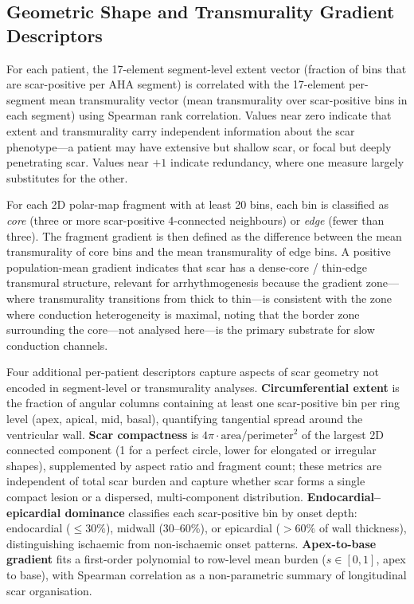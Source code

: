 \subsection{Geometric Shape and Transmurality Gradient Descriptors}

For each patient, the 17-element segment-level extent vector (fraction of bins that are
scar-positive per AHA segment) is correlated with the 17-element per-segment mean
transmurality vector (mean transmurality over scar-positive bins in each segment) using
Spearman rank correlation. Values near zero indicate that extent and transmurality carry
independent information about the scar phenotype---a patient may have extensive but
shallow scar, or focal but deeply penetrating scar.
Values near $+1$ indicate redundancy, where one measure largely substitutes for the other.

For each 2D polar-map fragment with at least 20 bins, each bin is classified as \emph{core}
(three or more scar-positive 4-connected neighbours) or \emph{edge} (fewer than three).
The fragment gradient is then defined as the difference between the mean transmurality of
core bins and the mean transmurality of edge bins. A positive population-mean gradient
indicates that scar has a dense-core / thin-edge transmural structure, relevant for
arrhythmogenesis because the gradient zone---where transmurality transitions from thick to
thin---is consistent with the zone where conduction heterogeneity is maximal, noting that
the border zone surrounding the core---not analysed here---is the primary substrate for slow
conduction channels.

Four additional per-patient descriptors capture aspects of scar geometry not encoded in
segment-level or transmurality analyses. \textbf{Circumferential extent} is the fraction of
angular columns containing at least one scar-positive bin per ring level (apex, apical, mid,
basal), quantifying tangential spread around the ventricular wall. \textbf{Scar compactness}
is $4\pi \cdot \text{area}/\text{perimeter}^2$ of the largest 2D connected component (1 for
a perfect circle, lower for elongated or irregular shapes), supplemented by aspect ratio and
fragment count; these metrics are independent of total scar burden and capture whether scar
forms a single compact lesion or a dispersed, multi-component distribution.
\textbf{Endocardial--epicardial dominance} classifies each scar-positive bin by onset depth:
endocardial ($\leq 30\%$), midwall (30--60\%), or epicardial ($> 60\%$ of wall thickness),
distinguishing ischaemic from non-ischaemic onset patterns. \textbf{Apex-to-base gradient}
fits a first-order polynomial to row-level mean burden ($s \in [0,1]$, apex to base), with
Spearman correlation as a non-parametric summary of longitudinal scar organisation.
